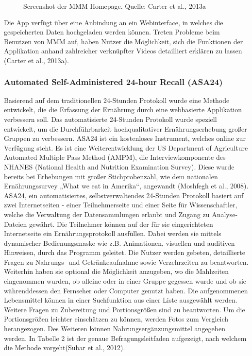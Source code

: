 \begin{figure}[h]
	\caption[Screenshot der MMM Homepage]{Screenshot der MMM Homepage. Quelle: Carter et al., 2013a}
	\label{bild2}
\end{figure}


Die App verfügt über eine Anbindung an ein Webinterface, in welches die gespeicherten Daten hochgeladen werden können. Treten Probleme beim Benutzen von MMM auf, haben Nutzer die Möglichkeit, sich die Funktionen der Applikation anhand zahlreicher verknüpfter Videos detailliert erklären zu lassen (Carter et al., 2013a).



\subsubsection{Automated Self-Administered 24-hour Recall (ASA24)}

Basierend auf dem traditionellen 24-Stunden Protokoll wurde eine Methode entwickelt, die die Erfassung der Ernährung durch eine webbasierte Applikation verbessern soll. Das automatisierte 24-Stunden Protokoll wurde speziell entwickelt, um die Durchführbarkeit hochqualitativer Ernährungserhebung großer Gruppen zu verbessern. ASA24 ist ein kostenloses Instrument, welches online zur Verfügung steht. Es ist eine Weiterentwicklung der US Department of Agriculture Automated Multiple Pass Method (AMPM), die Interviewkomponente des NHANES (National Health and Nutrition Examination Survey). Diese wurde bereits bei Erhebungen mit großer Stichprobenzahl, wie dem nationalen Ernährungssurvey „What we eat in Amerika“, angewandt (Moshfegh et al., 2008).  ASA24, ein automatisiertes, selbstverwaltendes 24-Stunden Protokoll basiert auf zwei Internetseiten - einer Teilnehmerseite und einer Seite für  Wissenschaftler, welche die Verwaltung der Datensammlungen erlaubt und Zugang zu Analyse-Dateien gewährt. Die Teilnehmer können auf der für sie eingerichteten Internetseite ein Ernährungsprotokoll ausfüllen. Dabei werden sie mittels dynamischer Bedienungsmaske wie z.B. Animationen, visuellen und auditiven Hinweisen, durch das Programm geleitet. Die Nutzer werden gebeten, detaillierte Fragen zu Nahrungs- und Getränkeaufnahme sowie Verzehrzeiten zu beantworten. Weiterhin haben sie optional die Möglichkeit anzugeben, wo die Mahlzeiten eingenommen wurden, ob alleine oder in einer Gruppe gegessen wurde und ob sie währenddessen den Fernseher oder Computer genutzt haben. Die aufgenommenen Lebensmittel können in einer Suchfunktion aus einer Liste ausgewählt werden. Weitere Fragen zu Zubereitung und Portionsgrößen sind zu beantworten. Um die Portionsgrößen leichter einschätzen zu können, werden Fotos zum Vergleich herangezogen. Des Weiteren können Nahrungsergänzungsmittel angegeben werden. In Tabelle 2 ist der genaue Befragungsleitfaden aufgezeigt, nach welchem die Methode vorgeht(Subar et al., 2012). 

